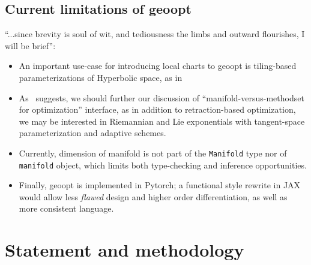 \subsection{Current limitations of geoopt} \label{sec:geooptTodo}

``...since brevity is soul of wit, and tediousness the limbs and outward
flourishes, I will be brief'':
\begin{itemize}
\item An important use-case for introducing local charts to geoopt is tiling-based
parameterizations of Hyperbolic space, as in~\citet{yaSaTilingBased}
\item As~\citet{trivializations} suggests, we should further our discussion of
``manifold-versus-methodset for optimization'' interface, as in addition to
retraction-based optimization, we may be interested in Riemannian and Lie
exponentials with tangent-space parameterization and adaptive schemes.
\item Currently, dimension of manifold is not part of the \texttt{Manifold}
type nor of \texttt{manifold} object, which limits both type-checking and
inference opportunities.
\item Finally, geoopt is implemented in Pytorch; a functional style rewrite in
JAX would allow less \emph{flawed} design and higher order differentiation, as
well as more consistent language.
\end{itemize}

\section{Statement and methodology} \label{sec:statement}

